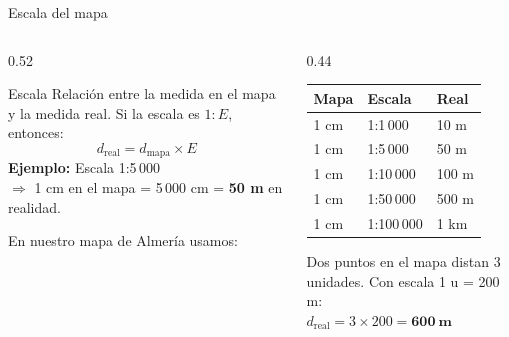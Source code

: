 \documentclass[aspectratio=169, 10pt, spanish]{beamer}
\begin{document}

\begin{frame}{Escala del mapa}
  \begin{columns}[T]
    \begin{column}{0.52\textwidth}
      \begin{definicionbox}{Escala}
        Relación entre la medida en el mapa y la medida real.
        Si la escala es $1{:}E$, entonces:
        \[
          d_{\text{real}} = d_{\text{mapa}} \times E
        \]
        \textbf{Ejemplo:} Escala 1:5\,000\\
        $\Rightarrow$ 1 cm en el mapa = 5\,000 cm = \textbf{50 m} en realidad.
      \end{definicionbox}
      \vspace{8pt}
      En nuestro mapa de Almería usamos:
      \begin{center}
      \end{center}
    \end{column}
    \begin{column}{0.44\textwidth}
      \begin{tabular}{lll}
        \toprule
        \textbf{Mapa} & \textbf{Escala} & \textbf{Real}\\
        \midrule
        1 cm & 1:1\,000  & 10 m\\
        1 cm & 1:5\,000  & 50 m\\
        1 cm & 1:10\,000 & 100 m\\
        1 cm & 1:50\,000 & 500 m\\
        1 cm & 1:100\,000 & 1 km\\
        \bottomrule
      \end{tabular}
      \vspace{8pt}
      \begin{ejemplobox}
        \AlmFontFootnote
        Dos puntos en el mapa distan 3 unidades.
        Con escala 1 u = 200 m:\\
        $d_{\text{real}} = 3 \times 200 = \mathbf{600\ \text{m}}$
      \end{ejemplobox}
    \end{column}
  \end{columns}
\end{frame}
\end{document}
